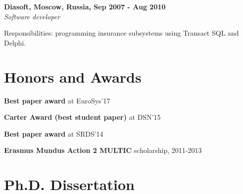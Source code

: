 \documentclass[letterpaper]{article}
\renewenvironment{itemize}{
  \begin{list}{}{
    \setlength{\leftmargin}{1.5em}
  }
}{
  \end{list}
}
\begin{document}
\vspace{-2mm}

{\bf Diasoft, Moscow, Russia, Sep 2007 - Aug 2010}\\
{\em Software developer}
\begin{itemize}
	\item Responsibilities: programming insurance subsystems using Transact SQL and Delphi.
\end{itemize}


\section*{Honors and Awards}

\begin{itemize}
\item \textbf{Best paper award} at EuroSys'17
\item \textbf{Carter Award (best student paper)} at DSN'15
\item \textbf{Best paper award} at SRDS'14
\item \textbf{Erasmus Mundus Action 2 MULTIC} scholarship, 2011-2013

\end{itemize}


\section* {Ph.D. Dissertation}
\end{document}
